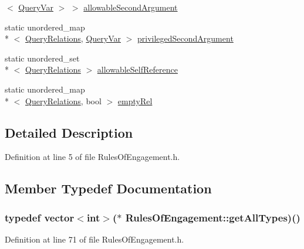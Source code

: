 \begin{DoxyCompactItemize}
$<$ \hyperlink{class_rules_of_engagement_a5dd2b28fd0c906d9b08e29e371713ead}{Query\-Var} $>$ $>$ \hyperlink{class_rules_of_engagement_a365f61557120f33a18021667e746f13e}{allowable\-Second\-Argument}
\item 
static unordered\-\_\-map\\*
$<$ \hyperlink{class_rules_of_engagement_a5e08db2a0638b98dbb06ad923a33d817}{Query\-Relations}, \hyperlink{class_rules_of_engagement_a5dd2b28fd0c906d9b08e29e371713ead}{Query\-Var} $>$ \hyperlink{class_rules_of_engagement_acdc0a8ed701246134911b36aac249c6c}{privileged\-Second\-Argument}
\item 
static unordered\-\_\-set\\*
$<$ \hyperlink{class_rules_of_engagement_a5e08db2a0638b98dbb06ad923a33d817}{Query\-Relations} $>$ \hyperlink{class_rules_of_engagement_a8c7c45f1c886563e1a9e62cd0c22866d}{allowable\-Self\-Reference}
\item 
static unordered\-\_\-map\\*
$<$ \hyperlink{class_rules_of_engagement_a5e08db2a0638b98dbb06ad923a33d817}{Query\-Relations}, bool $>$ \hyperlink{class_rules_of_engagement_a343933b8d961a5dfab7a3cdd979820cf}{empty\-Rel}
\end{DoxyCompactItemize}


\subsection{Detailed Description}


Definition at line 5 of file Rules\-Of\-Engagement.\-h.



\subsection{Member Typedef Documentation}
\hypertarget{class_rules_of_engagement_a1a051f48865a7a4d7f07f0a89f16aafe}{
\subsubsection[{get\-All\-Types}]{\setlength{\rightskip}{0pt plus 5cm}typedef vector$<$int$>$($\ast$ Rules\-Of\-Engagement\-::get\-All\-Types)()}}\label{class_rules_of_engagement_a1a051f48865a7a4d7f07f0a89f16aafe}


Definition at line 71 of file Rules\-Of\-Engagement.\-h.

